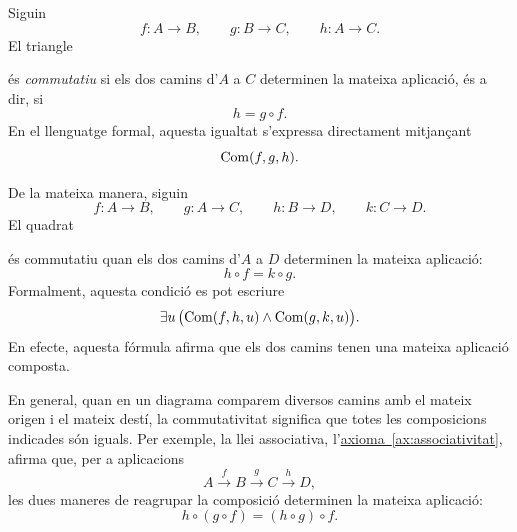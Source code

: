 Siguin
\[
f:A\to B,\qquad g:B\to C,\qquad h:A\to C.
\]
El triangle
\begin{center}
\end{center}
és \emph{commutatiu} si els dos camins d'\(A\) a \(C\) determinen la mateixa aplicació, és a dir, si
\[
h=g\circ f.
\]
En el llenguatge formal, aquesta igualtat s'expressa directament mitjançant
\[
\operatorname{Com}(f,g,h).
\]

De la mateixa manera, siguin
\[
f:A\to B,\qquad g:A\to C,\qquad h:B\to D,\qquad k:C\to D.
\]
El quadrat
\begin{center}
\end{center}
és commutatiu quan els dos camins d'\(A\) a \(D\) determinen
la mateixa aplicació:
\[
h\circ f=k\circ g.
\]
Formalment, aquesta condició es pot escriure
\[
\exists u\,\bigl(\operatorname{Com}(f,h,u)\land\operatorname{Com}(g,k,u)\bigr).
\]
En efecte, aquesta fórmula afirma que els dos camins tenen una
mateixa aplicació composta.

En general, quan en un diagrama comparem diversos camins amb
el mateix origen i el mateix destí, la commutativitat significa
que totes les composicions indicades són iguals. Per exemple,
la llei associativa, l'\hyperref[ax:associativitat]{axioma~\ref*{ax:associativitat}}, afirma que, per a aplicacions
\[
A\xrightarrow{f}B\xrightarrow{g}C\xrightarrow{h}D,
\]
les dues maneres de reagrupar la composició determinen la mateixa
aplicació:
\[
h\circ(g\circ f)=(h\circ g)\circ f.
\]

